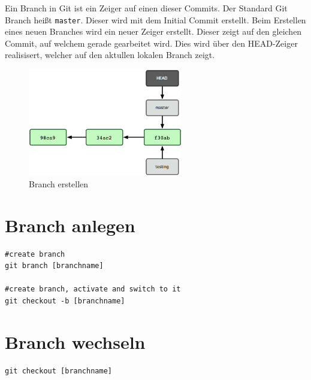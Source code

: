 Ein Branch in Git ist ein Zeiger auf einen dieser Commits. Der Standard Git Branch heißt \texttt{master}. Dieser wird mit dem Initial Commit erstellt. Beim Erstellen eines neuen Branches wird ein neuer Zeiger erstellt. Dieser zeigt auf den gleichen Commit, auf welchem gerade gearbeitet wird. Dies wird über den HEAD-Zeiger realisisert, welcher auf den aktullen lokalen Branch zeigt.
\begin{figure}[ht]
	\centering
		\includegraphics[width=0.6\textwidth]{img/branch.png}
	\caption{Branch erstellen}
\end{figure}
\newpage
\section{Branch anlegen}
\begin{lstlisting}[caption={Branch anlegen},captionpos=b]
#create branch
git branch [branchname]

#create branch, activate and switch to it
git checkout -b [branchname]
\end{lstlisting}
\section{Branch wechseln}
\begin{lstlisting}[caption={Branch wechseln},captionpos=b]
git checkout [branchname]
\end{lstlisting}
